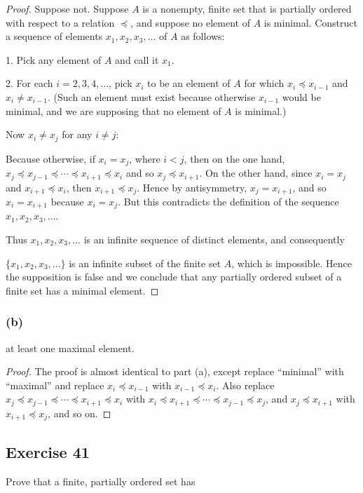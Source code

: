 \documentclass[14pt]{extarticle}
\begin{document}
\begin{proof}
Suppose not. Suppose $A$ is a nonempty, finite set that is partially ordered with respect to a relation \(\preceq\), 
and suppose no element of $A$ is minimal. Construct a sequence of elements \(x_1, x_2, x_3, \ldots\) of $A$ as 
follows: 

1. Pick any element of $A$ and call it \(x_1\).

2. For each \(i = 2, 3, 4, \ldots\), pick \(x_i\) to be an element of $A$ for which \(x_i \preceq x_{i-1}\) and \(x_i 
\neq x_{i-1}\). (Such an element must exist because otherwise \(x_{i-1}\) would be minimal, and we are 
supposing that no element of $A$ is minimal.)

Now \(x_i \neq x_j\) for any \(i \neq j\): 

Because otherwise, if \(x_i = x_j\), where \(i < j\), then on the one hand, \(x_j \preceq x_{j-1} \preceq \cdots 
\preceq x_{i+1} \preceq x_i\) and so \(x_j \preceq x_{i+1}\). On the other hand, since \(x_i = x_j\) and \(x_{i+1} 
\preceq x_i\), then \(x_{i+1} \preceq x_j\). Hence by antisymmetry, \(x_j = x_{i+1}\), and so \(x_i = x_{i+1}\) 
because \(x_i = x_j\). But this contradicts the definition of the sequence \(x_1, x_2 , x_3, \ldots\).

Thus \(x_1, x_2, x_3, \ldots\) is an infinite sequence of distinct elements, and consequently 

\(\{x_1, x_2, x_3, \ldots\}\) is an infinite subset of the finite set $A$, which is impossible. Hence the supposition 
is false and we conclude that any partially ordered subset of a finite set has a minimal element.
\end{proof}

\subsubsection{(b)}
at least one maximal element.

\begin{proof}
The proof is almost identical to part (a), except replace ``minimal'' with ``maximal'' and replace \(x_i \preceq 
x_{i-1}\) with \(x_{i-1} \preceq x_i\). Also replace \(x_j \preceq x_{j-1} \preceq \cdots \preceq x_{i+1}\preceq x_i\)
with \(x_i \preceq x_{i+1} \preceq \cdots \preceq x_{j-1} \preceq x_j\), and \(x_j \preceq x_{i+1}\) with \(x_{i+1} 
\preceq x_j\), and so on.
\end{proof}

\subsection{Exercise 41}
Prove that a finite, partially ordered set has
\end{document}
